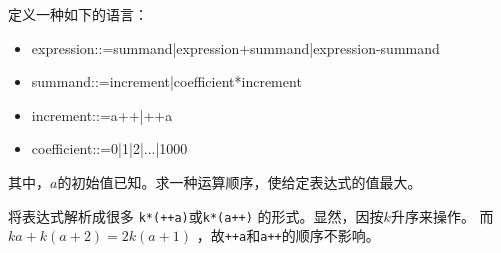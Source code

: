 \begin{prob}
	定义一种如下的语言：
	\begin{itemize}
		\item expression::=summand|expression+summand|expression-summand
		\item summand::=increment|coefficient*increment
		\item increment::=a++|++a
		\item coefficient::=0|1|2|...|1000
	\end{itemize}
	其中，$a$的初始值已知。求一种运算顺序，使给定表达式的值最大。
\end{prob}

\begin{sol}
	将表达式解析成很多
	\texttt{k*(++a)}或\texttt{k*(a++)}
	的形式。显然，因按$k$升序来操作。
	而$ka+k(a+2)=2k(a+1)$
	，故\texttt{++a}和\texttt{a++}的顺序不影响。
\end{sol}
